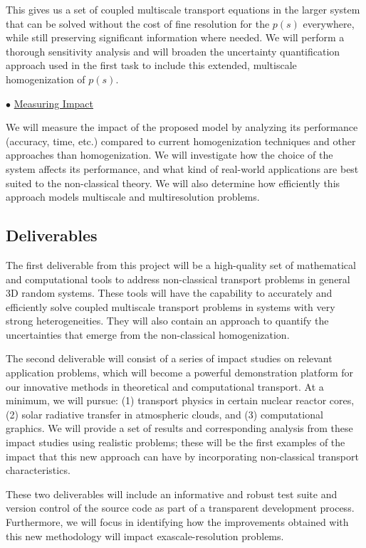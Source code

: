 \documentclass[12pt]{article}
\begin{document}
This gives us a set of coupled multiscale transport equations in the larger system that can be solved without the cost of fine resolution for the $p(s)$ everywhere, while still preserving significant information where needed.
We will perform a thorough sensitivity analysis and will broaden the uncertainty quantification approach used in the first task to include this extended, multiscale homogenization of $p(s)$.

$\bullet$ \underline{Measuring Impact}

We will measure the impact of the proposed model by analyzing its performance (accuracy, time, etc.) compared to current homogenization techniques and other approaches than homogenization.
We will investigate how the choice of the system affects its performance, and what kind of real-world applications are best suited to the non-classical theory.
We will also determine how efficiently this approach models multiscale and multiresolution problems.


\subsection{Deliverables}

The first deliverable from this project will be a high-quality set of mathematical and computational tools to address non-classical transport problems in general 3D random systems.
These tools will have the capability to accurately and efficiently solve coupled multiscale transport problems in systems with very strong heterogeneities.
They will also contain an approach to quantify the uncertainties that emerge from the non-classical homogenization.

The second deliverable will consist of a series of impact studies on relevant application problems, which will become a powerful demonstration platform for our innovative methods in theoretical and computational transport.
At a minimum, we will pursue:
(1) transport physics in certain nuclear reactor cores,
(2) solar radiative transfer in atmospheric clouds, and
(3) computational graphics.
We will provide a set of results and corresponding analysis from these impact studies using realistic problems;
these will be the first examples of the impact that this new approach can have by incorporating non-classical transport characteristics.

These two deliverables will include an informative and robust test suite and version control of the source code as part of a transparent development process.
Furthermore, we will focus in identifying how the improvements obtained with this new methodology will impact exascale-resolution problems.
\end{document}
